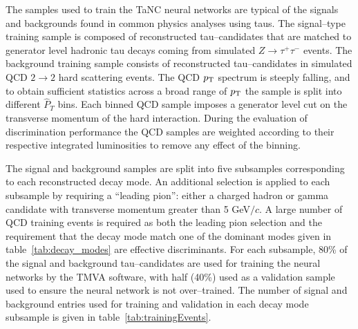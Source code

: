 The samples used to train the TaNC neural networks are typical of the signals
and backgrounds found in common physics analyses using taus.  The signal--type
training sample is composed of reconstructed tau--candidates that are matched
to generator level hadronic tau decays coming from simulated $Z \rightarrow
\tau^{+}\tau^{-}$ events.  The background training sample consists of
reconstructed tau--candidates in simulated QCD $2\rightarrow2$ hard scattering
events.  The QCD $p_{\mathrm{T}}$ spectrum is steeply falling, and to obtain sufficient
statistics across a broad range of $p_{\mathrm{T}}$ the sample is split into different
$\hat P_{T}$ bins.  Each binned QCD sample imposes a generator level cut on the
transverse momentum of the hard interaction.  During the evaluation of discrimination
performance the QCD samples are weighted according to their respective
integrated luminosities to remove any effect of the binning.

The signal and background samples are split into five subsamples corresponding
to each reconstructed decay mode.  An additional selection is applied to each
subsample by requiring a ``leading pion'': either a charged hadron or gamma
candidate with transverse momentum greater than 5 GeV$/c$.  A large number of
QCD training events is required as both the leading pion selection and the
requirement that the decay mode match one of the dominant modes given in
table~\ref{tab:decay_modes} are effective discriminants.  For each subsample,
80\% of the signal and background tau--candidates are used for training the
neural networks by the TMVA software, with half (40\%) used as a validation
sample used to ensure the neural network is not over--trained. The number of
signal and background entries used for training and validation in each decay
mode subsample is given in table~\ref{tab:trainingEvents}.



